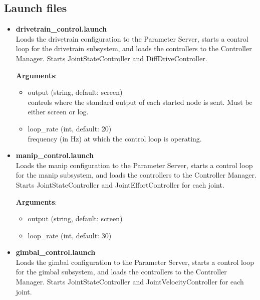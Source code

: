 \documentclass[english,inz,shortabstract]{iithesis}
\newcommand{\val}[1]{\textbf{\textsf{#1}}}
\begin{document}
	\subsection{Launch files}

		\begin{itemize}
			\item \val{drivetrain\_control.launch}\\
			Loads the drivetrain configuration to the Parameter Server, starts a control loop for the drivetrain subsystem, and loads the controllers to the Controller Manager. Starts \textsf{JointStateController} and \textsf{DiffDriveController}.

			\textbf{Arguments}:
			\begin{itemize}[itemsep=0pt, parsep=2pt, topsep=0pt]
				\item \textsf{output} (\textsf{string}, default: \textsf{screen})\\
				controls where the standard output of each started node is sent. Must be either \textsf{screen} or \textsf{log}.
				\item \textsf{loop\_rate} (\textsf{int}, default: \textsf{20})\\
				frequency (in Hz) at which the control loop is operating.
			\end{itemize}

			\item \val{manip\_control.launch}\\
			Loads the manip configuration to the Parameter Server, starts a control loop for the manip subsystem, and loads the controllers to the Controller Manager. Starts \textsf{JointStateController} and \textsf{JointEffortController} for each joint.

			\textbf{Arguments}:
			\begin{itemize}[itemsep=0pt, parsep=2pt, topsep=0pt]
				\item \textsf{output} (\textsf{string}, default: \textsf{screen})
				\item \textsf{loop\_rate} (\textsf{int}, default: \textsf{30})
			\end{itemize}

			\item \val{gimbal\_control.launch}\\
			Loads the gimbal configuration to the Parameter Server, starts a control loop for the gimbal subsystem, and loads the controllers to the Controller Manager. Starts \textsf{JointStateController} and \textsf{JointVelocityController} for each joint.


\end{itemize}
\end{document}
